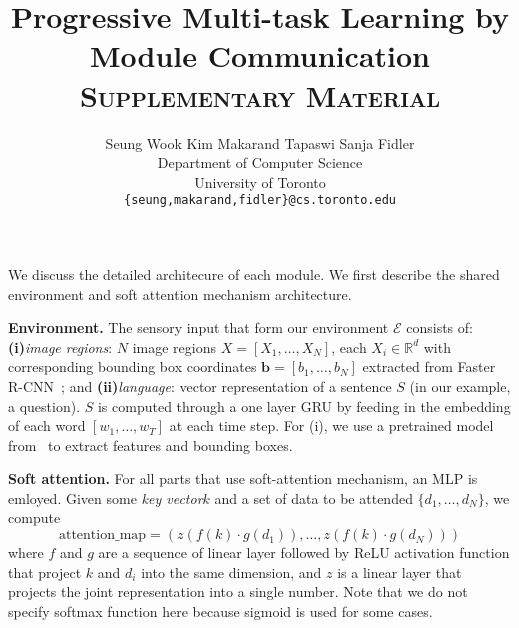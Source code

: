 \documentclass{article}
\title{Progressive Multi-task Learning by Module Communication\\
\textsc{Supplementary Material}}
\author{
  Seung Wook Kim \hspace{0.5cm} Makarand Tapaswi \hspace{0.5cm} Sanja Fidler \\
  Department of Computer Science\\
  University of Toronto\\
  \texttt{\{seung,makarand,fidler\}@cs.toronto.edu} \\
}
\def\E{\mathcal{E}}
\begin{document}
\maketitle


We discuss the detailed architecure of each module. We first describe the shared environment and soft attention mechanism architecture.

\textbf{Environment.}\hspace{2mm}
The sensory input that form our environment $\E$ consists of:
{\bf (i)}\emph{image regions}: $N$ image regions $X=[X_1, \ldots, X_N]$, each $X_i \in \mathbb{R}^{d}$ with corresponding bounding box coordinates $\mathbf{b}=[b_1, \ldots, b_N]$ extracted from Faster R-CNN~\citep{ren15}; and
{\bf (ii)}\emph{language}: vector representation of a sentence $S$ (in our example, a question).
$S$ is computed through a one layer GRU by feeding in the embedding of each word $[w_1,\ldots,w_T]$ at each time step.
For (i), we use a pretrained model from~\citet{anderson17} to extract features and bounding boxes.

\textbf{Soft attention.}\hspace{2mm}
For all parts that use soft-attention mechanism, an MLP is emloyed.
Given some \emph{key vector}$k$ and a set of data to be attended $\{d_1,\ldots,d_N\}$, we compute
\begin{equation}
\mathrm{attention\_map} = (z(f(k)\cdot g(d_1)), \ldots, z(f(k)\cdot g(d_N)))
\end{equation}
where $f$ and $g$ are a sequence of linear layer followed by ReLU activation function that project $k$ and $d_i$ into the same dimension, and $z$ is a linear layer that projects the joint representation into a single number.
Note that we do not specify softmax function here because sigmoid is used for some cases.
\end{document}

